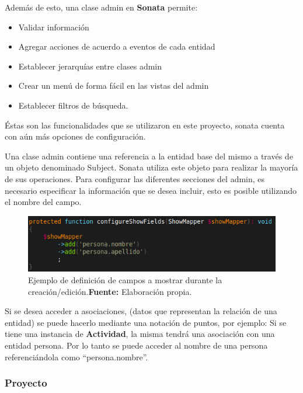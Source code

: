 \noindent
Además de esto, una clase admin en \textbf{Sonata} permite:
\begin{itemize}
    \item Validar información
    \item Agregar acciones de acuerdo a eventos de cada entidad
    \item Establecer jerarquías entre clases admin
    \item Crear un menú de forma fácil en las vistas del admin
    \item Establecer filtros de búsqueda.
\end{itemize}

Éstas son las funcionalidades que se utilizaron en este proyecto, sonata cuenta con aún más opciones de configuración.

Una clase admin contiene una referencia a la entidad base del mismo a través de un objeto denominado Subject. Sonata utiliza este objeto para realizar
la mayoría de sus operaciones.
Para configurar las diferentes secciones del admin, es necesario especificar la información que se desea incluir, esto es posible utilizando el nombre del campo.

\begin{figure}[h]
    \includegraphics[width=1\linewidth]{image/show.png}
    \caption{Ejemplo de definición de campos a mostrar durante la creación/edición.\newline \textbf{Fuente:} Elaboración propia.}
    \label{fig:image/show}
\end{figure}

Si se desea acceder a asociaciones, (datos que representan la relación de una entidad) se puede hacerlo mediante una notación de puntos, por ejemplo:
Si se tiene una instancia de \textbf{Actividad}, la misma tendrá una asociación con una entidad persona. Por lo tanto se puede acceder al nombre de una persona referenciándola como ``persona.nombre''.

\subsubsection{Proyecto}%
\label{ssub:admin_proyectadmin_proyecto}

